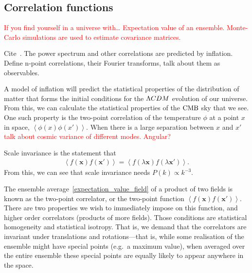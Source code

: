     \subsection{Correlation functions}\label{corr_functions}
    \textcolor{red}{If you find yourself in a universe with\ldots
    Expectation value of an ensemble.
    Monte-Carlo simulations are used to estimate covariance matrices.}


    Cite~\cite{Planck_inflation_2015, Planck_inflation_2018}.
    The power spectrum and other correlations
    are predicted by inflation. 
    Define n-point correlations, their Fourier transforms, talk about them as observables.
    

    A model of inflation will predict the statistical properties of the distribution of matter
    that forms the initial conditions for the $\Lambda CDM$ evolution of our universe.
    From this, we can calculate the statistical properties of the $\text{CMB}$ sky that we see.
    One such property is the two-point correlation of the temperature $\phi$
    at a point $x$ in space, $\left<\phi(x)\phi(x')\right>$. When there is a large
    separation between $x$ and $x'$ \textcolor{red}{talk about cosmic variance
    of different modes. Angular?}

    Scale invariance is the statement that
    \begin{align}
        \left<f(\mathbf{x})f(\mathbf{x'})\right> = \left<f(\lambda\mathbf{x})f(\lambda\mathbf{x'})\right>.
    \end{align}
    From this, we can see that scale invariance needs $P(k)\propto k^{-3}$.


    The ensemble average~\eqref{expectation_value_field} of a product of two fields is known as the
    two-point correlator, or the two-point function $\left<f(\mathbf{x})f(\mathbf{x'})\right>$.
    There are two properties we wish to immediately impose on this function, and higher order correlators
    (products of more fields). Those conditions are statistical homogeneity and statistical isotropy.
    That is, we demand that the correlators are invariant under translations and rotations---that is,
    while some realisation of the ensemble might have special points (e.g.\ a maximum value),
    when averaged over the entire ensemble these special points are equally likely to appear anywhere in
    the space.


